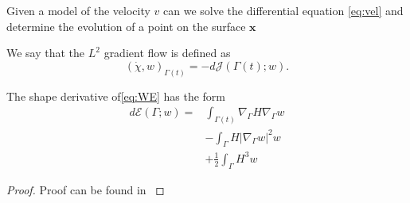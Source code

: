 Given a model of the velocity $v$ can we solve the differential equation \eqref{eq:vel} and determine the evolution of a point on the surface $\mathbf{x}$




We say that the $L^{2}$  gradient flow is defined as
\[
\left( \dot{\chi } , w \right)_{\Gamma \left( t \right)  } = -d\mathcal{J}\left( \Gamma \left( t \right); w  \right).
\]


\begin{lemma}
The shape derivative of\eqref{eq:WE} has the form
\[
    \begin{split}
        d\mathcal{E} \left( \Gamma; w  \right)  =& \int_{\Gamma \left( t \right) }^{}  \nabla_{\Gamma } H  \nabla _{\Gamma } w    \\
    & - \int_{\Gamma }^{} H  |\nabla _{\Gamma }  w |^{2} w   \\
    &  + \frac{1}{2} \int_{\Gamma }^{} H^{3} w
    \end{split}
\]

\end{lemma}

\begin{proof}
    Proof can be found in \cite{willmore1996riemannian}
\end{proof}









